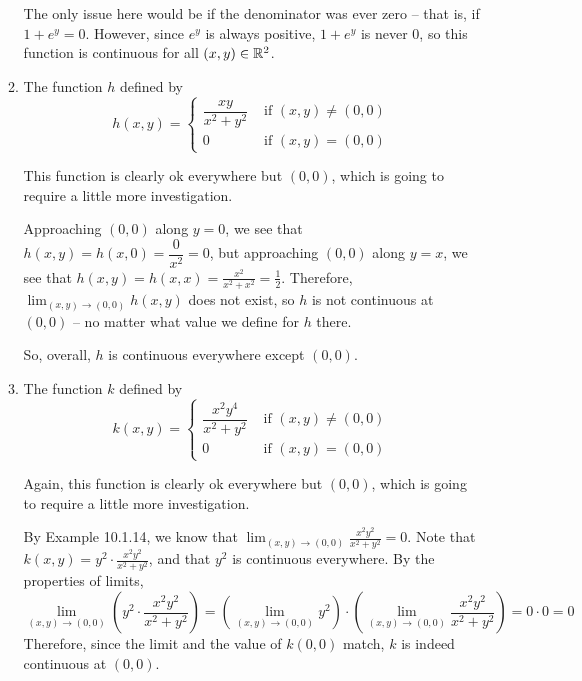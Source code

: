 \begin{enumerate}[leftmargin=0pt]
\begin{enumerate}
        \begin{red}
        The only issue here would be if the denominator was ever zero -- that is, if $1+e^y = 0$. However, since $e^y$ is always positive, $1+e^y$ is never 0, so this function is continuous for all $(x, y)\in \mathbb{R}^2$.
        \end{red}
        \item The function $h$ defined by \begin{equation*}
        h(x,y) = \begin{cases} 
            \dfrac{xy}{x^2+y^2} & \textrm{ if } (x,y) \neq (0,0)  \\ 
            0 & \textrm{ if } (x,y) = (0,0) 
        \end{cases}
        \end{equation*}
        
        \begin{red}
        This function is clearly ok everywhere but $(0,0)$, which is going to require a little more investigation. 
        
        Approaching $(0,0)$ along $y=0$, we see that $h(x,y) = h(x,0) = \dfrac{0}{x^2} = 0$, but approaching $(0, 0)$ along $y=x$, we see that $\displaystyle h(x, y) = h(x,x) = \frac{x^2}{x^2+x^2} = \frac{1}{2} $. Therefore, $\displaystyle\lim_{(x,y)\to(0,0)}h(x,y)$ does not exist, so $h$ is not continuous at $(0,0)$ -- no matter what value we define for $h$ there.
        
        So, overall, $h$ is continuous everywhere except $(0,0)$.
        \end{red}
        \item The function $k$ defined by
        \begin{equation*}
        k(x,y) = \begin{cases} 
            \dfrac{x^2y^4}{x^2+y^2} & \textrm{ if } (x,y) \neq (0,0)  \\ 
            0 & \textrm{ if } (x,y) = (0,0) 
        \end{cases}
        \end{equation*}
        
        \begin{red}
        {\everymath{\displaystyle}
        Again, this function is clearly ok everywhere but $(0,0)$, which is going to require a little more investigation.
        
        By Example 10.1.14, we know that $\lim_{(x,y)\to(0,0)} \frac{x^2y^2}{x^2+y^2} =0.$ Note that $k(x,y) = y^2 \cdot \frac{x^2y^2}{x^2+y^2}$, and that $y^2$ is continuous everywhere. By the properties of limits, 
        \[\lim_{(x,y)\to(0,0)}  \left(y^2 \cdot \frac{x^2y^2}{x^2+y^2}\right) = \left(\lim_{(x,y)\to(0,0)} y^2 \right) \cdot \left(\lim_{(x,y)\to(0,0)} \frac{x^2y^2}{x^2+y^2}\right) = 0 \cdot 0 = 0\] Therefore, since the limit and the value of $k(0,0)$ match, $k$ is indeed continuous at $(0,0)$.
        }
        \end{red}
    \end{enumerate}
    

\end{enumerate}
